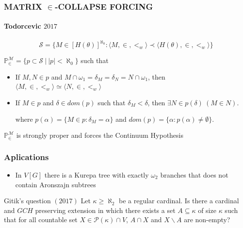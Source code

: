 \documentclass[10pt]{beamer}
\begin{document}
\begin{frame}
\frametitle{MATRIX $\in$-COLLAPSE FORCING}
\framesubtitle{Todorcevic $2017$}
\vspace{-10mm}
$$\mathcal{S}= \{M \in [H(\theta)]^{\aleph_0} : \langle M, \in, <_w \rangle \prec \langle H(\theta), \in, <_w \rangle \}$$
\vspace{-6mm}
\begin{block}{}
$\mathbb{P}_{\in}^{\mathcal{M}}= \{p \subset \mathcal{S} \ | \ |p| < \aleph_0 \}$ such that
\begin{itemize}
\item If $M, N \in p$ and $M \cap \omega_1 = \delta_M = \delta_N = N \cap \omega_1$, then $\langle M, \in, <_w \rangle \simeq \langle N, \in, <_w \rangle$
\item If $M \in p$ and $\delta \in dom(p)$ such that $\delta_M < \delta$, then $ \exists N \in p(\delta) \ (M \in N)$.

where $p(\alpha)=\{ M \in p : \delta_M=\alpha\}$ and $dom(p)= \{\alpha: p(\alpha) \neq \emptyset\}$.
\end{itemize}
\end{block}
$\mathbb{P}_{\in}^{\mathcal{M}}$ is strongly proper and forces the Continuum Hypothesis
\end{frame}
\begin{frame}
\frametitle{Aplications}
\begin{itemize}
\item In $V[G]$ there is a Kurepa tree with exactly $\omega_2$ branches that does not contain Aronszajn subtrees
\end{itemize}
\begin{block}{Gitik's question $(2017)$}
Let $\kappa \geq \aleph_2$ be a regular cardinal. Is there a cardinal and $GCH$ preserving extension in which there exists a set $A \subseteq \kappa$ of size $\kappa$ such that for all countable set $X \in \mathscr{P}(\kappa) \cap V$, $A \cap X$ and $X\backslash A$ are non-empty?
\end{block}
\end{frame}
\end{document}
